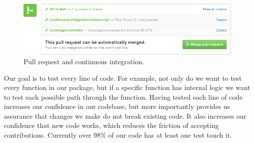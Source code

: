 %

%
%



\begin{figure}
  \begin{centering}
    \includegraphics[width=\textwidth]{fig/pull-request-ci.png}\par
  \end{centering}

  \caption{\label{fig:pull-request}Pull request and continuous integration.}
\end{figure}

Our goal is to test every line of code.  For example, not only do we want to
test every function in our package, but if a specific function has internal
logic we want to test each possible path through the function.  Having tested
each line of code increases our confidence in our codebase, but more
importantly provides us assurance that changes we make do not break existing
code.  It also increases our confidence that new code works, which reduces the
friction of accepting contributions.  Currently over 98\% of our code has at
least one test touch it.

